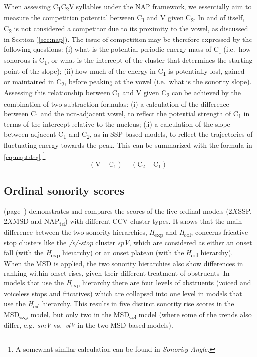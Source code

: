 When assessing C\textsubscript{1}C\textsubscript{2}V syllables under the NAP framework, we essentially aim to measure the competition potential between C\textsubscript{1} and V given C\textsubscript{2}. In and of itself, C\textsubscript{2} is not considered a competitor due to its proximity to the vowel, as discussed in Section (\ref{sec:nap}).
The issue of competition may be therefore expressed by the following questions:
(i) what is the potential periodic energy mass of C\textsubscript{1} (i.e.~how sonorous is C\textsubscript{1}, or what is the intercept of the cluster that determines the starting point of the slope);
(ii) how much of the energy in C\textsubscript{1} is potentially lost, gained or maintained in C\textsubscript{2}, before peaking at the vowel (i.e.~what is the sonority slope).
Assessing this relationship between C\textsubscript{1} and V given C\textsubscript{2} can be achieved by the combination of two subtraction formulas:
(i) a calculation of the difference between C\textsubscript{1} and the non-adjacent vowel, to reflect the potential strength of C\textsubscript{1} in terms of the intercept relative to the nucleus;
(ii) a calculation of the slope between adjacent C\textsubscript{1} and C\textsubscript{2}, as in SSP-based models, to reflect the trajectories of fluctuating energy towards the peak.
This can be summarized with the formula in \eqref{eq:naptdeq}.\footnote{A somewhat similar calculation can be found in 
\emph{Sonority Angle}.}
\begin{equation}
  (\text{V} - \text{C}_1) + (\text{C}_2 - \text{C}_1)  \label{eq:naptdeq}
\end{equation}

\subsection{Ordinal sonority scores}\label{sec:ordinalscores}

 (page~\pageref{tab:ordinalscores}) demonstrates and compares the scores of the five ordinal models (2\(X\)SSP, 2\(X\)MSD and NAP\textsubscript{td}) with different CCV cluster types. It shows that the main difference between the two sonority hierarchies, \emph{H}\textsubscript{exp} and \emph{H}\textsubscript{col}, concerns fricative-stop clusters like the \emph{/s/-stop} cluster \emph{spV}, which are considered as either an onset fall (with the \emph{H}\textsubscript{exp} hierarchy) or an onset plateau (with the \emph{H}\textsubscript{col} hierarchy). When the MSD is applied, the two sonority hierarchies also show differences in ranking within onset rises, given their different treatment of obstruents. In models that use the \emph{H}\textsubscript{exp} hierarchy there are four levels of obstruents (voiced and voiceless stops and fricatives) which are collapsed into one level in models that use the \emph{H}\textsubscript{col} hierarchy.
This results in five distinct sonority rise scores in the MSD\textsubscript{exp} model, but only two in the MSD\textsubscript{col} model (where some of the trends also differ, e.g.~\emph{smV} vs.~\emph{vlV} in the two MSD-based models).




